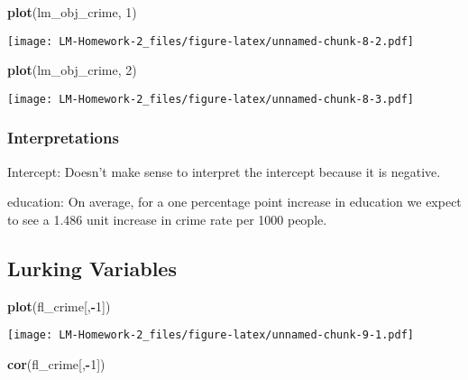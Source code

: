 \documentclass[
]{article}
\newenvironment{Shaded}{\begin{snugshade}}{\end{snugshade}}
\newcommand{\DecValTok}[1]{\textcolor[rgb]{0.00,0.00,0.81}{#1}}
\newcommand{\KeywordTok}[1]{\textcolor[rgb]{0.13,0.29,0.53}{\textbf{#1}}}
\newcommand{\NormalTok}[1]{#1}
\newcommand{\OperatorTok}[1]{\textcolor[rgb]{0.81,0.36,0.00}{\textbf{#1}}}
\begin{document}
\begin{Shaded}
\begin{Highlighting}[]
\KeywordTok{plot}\NormalTok{(lm_obj_crime, }\DecValTok{1}\NormalTok{)}
\end{Highlighting}
\end{Shaded}

\texttt{[image: LM-Homework-2\_files/figure-latex/unnamed-chunk-8-2.pdf]}

\begin{Shaded}
\begin{Highlighting}[]
\KeywordTok{plot}\NormalTok{(lm_obj_crime, }\DecValTok{2}\NormalTok{)}
\end{Highlighting}
\end{Shaded}

\texttt{[image: LM-Homework-2\_files/figure-latex/unnamed-chunk-8-3.pdf]}

\hypertarget{interpretations}{%
\subsubsection{Interpretations}\label{interpretations}}

Intercept: Doesn't make sense to interpret the intercept because it is
negative.

education: On average, for a one percentage point increase in education
we expect to see a 1.486 unit increase in crime rate per 1000 people.

\hypertarget{lurking-variables}{%
\subsection{Lurking Variables}\label{lurking-variables}}

\begin{Shaded}
\begin{Highlighting}[]
\KeywordTok{plot}\NormalTok{(fl_crime[,}\OperatorTok{-}\DecValTok{1}\NormalTok{])}
\end{Highlighting}
\end{Shaded}

\texttt{[image: LM-Homework-2\_files/figure-latex/unnamed-chunk-9-1.pdf]}

\begin{Shaded}
\begin{Highlighting}[]
\KeywordTok{cor}\NormalTok{(fl_crime[,}\OperatorTok{-}\DecValTok{1}\NormalTok{])}
\end{Highlighting}
\end{Shaded}
\end{document}
